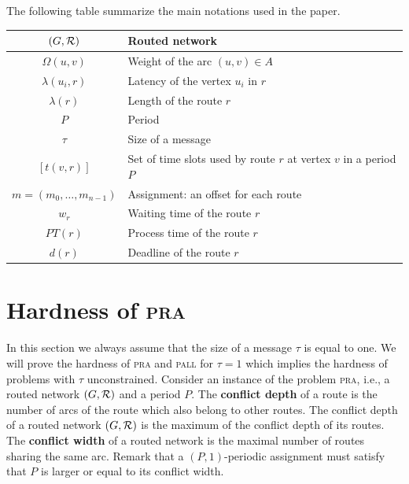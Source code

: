 \documentclass[10pt, conference, letterpaper]{IEEEtran}
\newcommand\pall{\textsc{pall}\xspace}
\newcommand\pra{\textsc{pra}\xspace}
\begin{document}
     
      The following table summarize the main notations used in the paper.
      \begin{center}
   \begin{tabularx}{0.5\textwidth}{|c|X|}
    \hline
     $(G,\cal R)$ & Routed network \\
     \hline
      $\Omega(u,v)$ & Weight of the arc $(u,v) \in A$ \\
      \hline
      $\lambda(u_i,r)$ & Latency of the vertex $u_i$ in $r$\\
         \hline
         $\lambda(r)$ & Length of the route $r$\\
         \hline
         $P$ & Period\\
         \hline
         $\tau$ & Size of a message\\
         \hline
         $ [t(v,r)]$& Set of time slots used by route $r$ at vertex $v$ in a period $P$\\
         \hline 
         $m=(m_0, \ldots ,m_{n-1})$& Assignment: an offset for each route\\
              \hline 
         $w_r$& Waiting time of the route $r$\\
            \hline 
         $PT(r)$& Process time of the route $r$\\
           \hline 
       $d(r)$ & Deadline of the route $r$\\
    \hline

      \end{tabularx}
      \end{center}


\section{Hardness of \pra}
  \label{sec:complexity}

 In this section we always assume that the size of a message $\tau$ is equal to one. 
 We will prove the hardness of \pra and \pall for $\tau =1$ which implies the hardness of problems with $\tau$ unconstrained. 
Consider an instance of the problem \pra, i.e., a routed network $(G,\cal{R})$ and a period $P$.
The {\bf conflict depth} of a route is the number of arcs of the route which also belong to other routes.
The conflict depth of a routed network $(G,\cal{R})$ is the maximum of the conflict depth of its routes.
The {\bf conflict width} of a routed network is the maximal number of routes sharing the same arc.
Remark that a $(P,1)$-periodic assignment must satisfy that $P$ is larger or equal to its conflict width.
\end{document}
